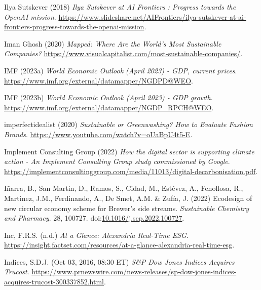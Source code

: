 \documentclass[
  letterpaper,
  DIV=11,
  numbers=noendperiod]{scrartcl}
\newlength{\cslhangindent}
\newenvironment{CSLReferences}[2] %
 {\begin{list}{}{%
  \setlength{\itemindent}{0pt}
  \setlength{\leftmargin}{0pt}
  \setlength{\parsep}{0pt}
  \ifodd #1
   \setlength{\leftmargin}{\cslhangindent}
   \setlength{\itemindent}{-1\cslhangindent}
  \fi
  \setlength{\itemsep}{#2\baselineskip}}}
 {\end{list}}
\begin{document}
\begin{CSLReferences}{0}{1}
Ilya Sutskever (2018) \emph{Ilya {Sutskever} at {AI Frontiers} :
{Progress} towards the {OpenAI} mission}.
\url{https://www.slideshare.net/AIFrontiers/ilya-sutskever-at-ai-frontiers-progress-towards-the-openai-mission}.

Iman Ghosh (2020) \emph{Mapped: {Where Are} the {World}'s {Most
Sustainable Companies}?}
\url{https://www.visualcapitalist.com/most-sustainable-companies/}.

IMF (2023a) \emph{World {Economic Outlook} ({April} 2023) - {GDP},
current prices}.
\url{https://www.imf.org/external/datamapper/NGDPD@WEO}.

IMF (2023b) \emph{World {Economic Outlook} ({April} 2023) - {GDP}
growth}. \url{https://www.imf.org/external/datamapper/NGDP_RPCH@WEO}.

imperfectidealist (2020) \emph{Sustainable or {Greenwashing}? {How} to
{Evaluate Fashion Brands}}.
\url{https://www.youtube.com/watch?v=oUaBpU4t5-E}.

Implement Consulting Group (2022) \emph{How the digital sector is
supporting climate action - {An Implement Consulting Group} study
commissioned by {Google}}.
\url{https://implementconsultinggroup.com/media/11013/digital-decarbonisation.pdf}.

Iñarra, B., San Martin, D., Ramos, S., Cidad, M., Estévez, A.,
Fenollosa, R., Martinez, J.M., Ferdinando, A., De Smet, A.M. \& Zufía,
J. (2022) Ecodesign of new circular economy scheme for {Brewer}'s side
streams. \emph{Sustainable Chemistry and Pharmacy}. 28, 100727.
doi:\href{https://doi.org/10.1016/j.scp.2022.100727}{10.1016/j.scp.2022.100727}.

Inc, F.R.S. (n.d.) \emph{At a {Glance}: {Alexandria Real-Time ESG}}.
\url{https://insight.factset.com/resources/at-a-glance-alexandria-real-time-esg}.

Indices, S.D.J. (Oct 03, 2016, 08:30 ET) \emph{S\&{P Dow Jones Indices
Acquires Trucost}}.
\url{https://www.prnewswire.com/news-releases/sp-dow-jones-indices-acquires-trucost-300337852.html}.


\end{CSLReferences}
\end{document}

